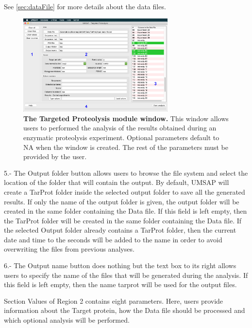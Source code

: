 See \autoref{sec:dataFile} for more details about the data files.

\begin{figure}[h]
    \centering
    \includegraphics[width=0.7\textwidth]{./IMAGES/MOD-TARPROT/tarprot-mod.jpg}
    \caption[The Targeted Proteolysis module window]{\textbf{The Targeted Proteolysis module window.} This window allows users to performed the analysis of the results obtained during an enzymatic proteolysis experiment. Optional parameters default to NA when the window is created. The rest of the parameters must be provided by the user.} 
    \label{fig:tarprotMainWindow}
    \vspace{-5pt} 	
\end{figure} 

\num{5}.- The Output folder\label{par:tarprotOutFolder} button allows users to browse the file system and select the location of the folder that will contain the output. By default, UMSAP will create a TarProt folder inside the selected output folder to save all the generated results. If only the name of the output folder is given, the output folder will be created in the same folder containing the Data file. If this field is left empty, then the TarProt folder will be created in the same folder containing the Data file. If the selected Output folder already contains a TarProt folder, then the current date and time to the seconds will be added to the name in order to avoid overwriting the files from previous analyses.

\num{6}.- The Output name button does nothing but the text box to its right allows users to specify the name of the files that will be generated during the analysis. If this field is left empty, then the name tarprot will be used for the output files. 

Section Values of Region \num{2} contains eight parameters. Here, users provide information about the Target protein, how the Data file should be processed and which optional analysis will be performed.

